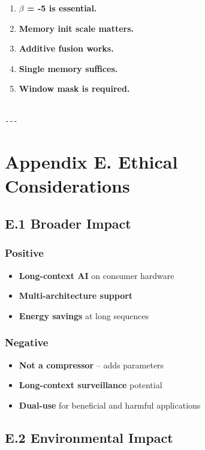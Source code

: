 \begin{enumerate}
\item \textbf{$\beta$ = -5 is essential.}
\item \textbf{Memory init scale matters.}
\item \textbf{Additive fusion works.}
\item \textbf{Single memory suffices.}
\item \textbf{Window mask is required.}
\end{enumerate}
\begin{lstlisting}

---
\end{lstlisting}


\section{Appendix E. Ethical Considerations}

\subsection{E.1 Broader Impact}

\subsubsection{Positive}
\begin{itemize}
\item \textbf{Long-context AI} on consumer hardware
\item \textbf{Multi-architecture support}
\item \textbf{Energy savings} at long sequences

\end{itemize}
\subsubsection{Negative}
\begin{itemize}
\item \textbf{Not a compressor} -- adds parameters
\item \textbf{Long-context surveillance} potential
\item \textbf{Dual-use} for beneficial and harmful applications

\end{itemize}
\subsection{E.2 Environmental Impact}

